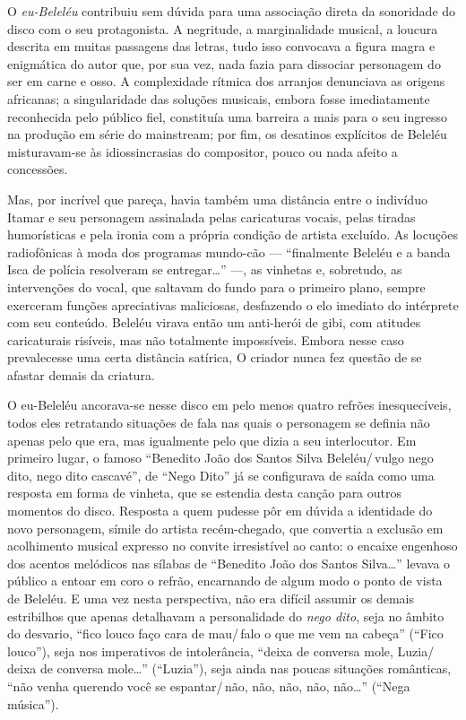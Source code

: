 O \textit{eu-Beleléu} contribuiu sem dúvida para uma associação direta
da sonoridade do disco com o seu protagonista. A negritude, a
marginalidade musical, a loucura descrita em muitas passagens das
letras, tudo isso convocava a figura magra e enigmática do autor que,
por sua vez, nada fazia para dissociar personagem do ser em carne e
osso. A complexidade rítmica dos arranjos denunciava as origens
africanas; a singularidade das soluções musicais, embora fosse
imediatamente reconhecida pelo público fiel, constituía uma barreira a
mais para o seu ingresso na produção em série do mainstream; por fim, os
desatinos explícitos de Beleléu misturavam-se às idiossincrasias do
compositor, pouco ou nada afeito a concessões.

Mas, por incrível que pareça, havia também uma distância entre o
indivíduo Itamar e seu personagem assinalada pelas caricaturas vocais,
pelas tiradas humorísticas e pela ironia com a própria condição de
artista excluído. As locuções radiofônicas à moda dos programas
mundo-cão --- ``finalmente Beleléu e a banda Isca de polícia resolveram se
entregar\ldots'' ---, as vinhetas e, sobretudo, as intervenções do vocal, que
saltavam do fundo para o primeiro plano, sempre exerceram funções
apreciativas maliciosas, desfazendo o elo imediato do intérprete com seu
conteúdo. Beleléu virava então um anti-herói de gibi, com atitudes
caricaturais risíveis, mas não totalmente impossíveis. Embora nesse caso
prevalecesse uma certa distância satírica, O criador nunca fez questão
de se afastar demais da criatura.

O eu-Beleléu ancorava-se nesse disco em pelo menos quatro refrões
inesquecíveis, todos eles retratando situações de fala nas quais o
personagem se definia não apenas pelo que era, mas igualmente pelo que
dizia a seu interlocutor. Em primeiro lugar, o famoso ``Benedito João
dos Santos Silva Beleléu/\,vulgo nego dito, nego dito cascavé'', de ``Nego
Dito'' já se configurava de saída \textbar{} como uma resposta em forma de
vinheta, que se estendia desta canção para outros momentos do disco.
Resposta a quem pudesse pôr em dúvida a identidade do novo personagem,
símile do artista recém-chegado, que convertia a exclusão em acolhimento
musical expresso no convite irresistível ao canto: o encaixe engenhoso
dos acentos melódicos nas sílabas de ``Benedito João dos Santos
Silva\ldots'' levava o público a entoar em coro o refrão, encarnando de
algum modo o ponto de vista de Beleléu. E uma vez nesta perspectiva, não
era difícil assumir os demais estribilhos que apenas detalhavam a
personalidade do \textit{nego dito}, seja no âmbito do desvario, ``fico louco
faço cara de mau/\,falo o que me vem na cabeça'' (``Fico louco''), seja nos
imperativos de intolerância, \textbar{} ``deixa de conversa mole, Luzia/\,deixa 
de conversa mole\ldots'' (``Luzia''), seja ainda nas poucas situações
românticas, ``não venha querendo você se espantar/\,não, não, não, não,
não\ldots'' (``Nega música'').

